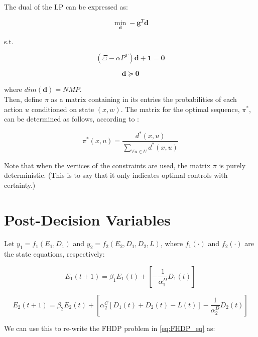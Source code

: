 \documentclass{article}
\begin{document}
	The dual of the LP can be expressed as:
	
	\begin{equation}
	\min_{\boldsymbol{d}} -\boldsymbol{g}^{T} \boldsymbol{d}
	\end{equation}
	
	s.t.
	
	\begin{displaymath} 
	(\Xi-\alpha P^{T})\boldsymbol{d} + \boldsymbol{1} = \boldsymbol{0}
	\end{displaymath}
	
	\begin{displaymath} 
	\boldsymbol{d} \succeq \boldsymbol{0}
	\end{displaymath}
	
	where $dim(\boldsymbol{d})=NMP$.\\
	
	Then, define $\pi$ as a matrix containing in its entries the probabilities of each action $u$ conditioned on state $(x,w)$. The matrix for the optimal sequence, $\pi^{*}$, can be determined as follows, according to \cite{4220813}:
	
	\begin{equation}
	\pi^{*}(x,u)=\frac{d^{*}(x,u)}{\sum_{\forall u \in U}d^{*}(x,u)}
	\end{equation}
	
	Note that when the vertices of the constraints are used, the matrix $\pi$ is purely deterministic\cite{MDPs}. (This is to say that it only indicates optimal controls with certainty.)
	
	
	
	
	\section{Post-Decision Variables}
	Let $y_{1}=f_{1}(E_{1},D_{1})$ and $y_{2}=f_{2}(E_{2},D_{1},D_{2},L)$, where $f_{1}(\cdot)$ and $f_{2}(\cdot)$ are the state equations, respectively:
	
	\begin{displaymath}
	E_{1}(t+1)=\beta_{1}E_{1}(t)+\left[-\frac{1}{\alpha_{1}^{D}}D_{1}(t)\right]
	\end{displaymath}
	
	\begin{displaymath}
	E_{2}(t+1)=\beta_{2}E_{2}(t)+\left[\alpha_{2}^{C}[D_{1}(t)+D_{2}(t)-L(t)]-\frac{1}{\alpha_{2}^{D}}D_{2}(t)\right]
	\end{displaymath}
	
	We can use this to re-write the FHDP problem in \eqref{eq:FHDP_eq} as:
	
\end{document}
